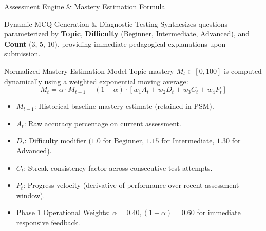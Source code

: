 \documentclass[aspectratio=169,10pt]{beamer}
\begin{document}
\begin{frame}{Assessment Engine \& Mastery Estimation Formula}
  \begin{block}{Dynamic MCQ Generation & Diagnostic Testing}
    Synthesizes questions parameterized by \textbf{Topic}, \textbf{Difficulty} (Beginner, Intermediate, Advanced), and \textbf{Count} (3, 5, 10), providing immediate pedagogical explanations upon submission.
  \end{block}
  \begin{exampleblock}{Normalized Mastery Estimation Model}
    Topic mastery $M_t \in [0, 100]$ is computed dynamically using a weighted exponential moving average:
    \begin{equation*}
      M_t = \alpha \cdot M_{t-1} + (1 - \alpha) \cdot \left[ w_1 A_t + w_2 D_t + w_3 C_t + w_4 P_t \right]
    \end{equation*}
    \small
    \begin{itemize}
      \item $M_{t-1}$: Historical baseline mastery estimate (retained in PSM).
      \item $A_t$: Raw accuracy percentage on current assessment.
      \item $D_t$: Difficulty modifier ($1.0$ for Beginner, $1.15$ for Intermediate, $1.30$ for Advanced).
      \item $C_t$: Streak consistency factor across consecutive test attempts.
      \item $P_t$: Progress velocity (derivative of performance over recent assessment window).
      \item Phase 1 Operational Weights: $\alpha = 0.40, (1-\alpha) = 0.60$ for immediate responsive feedback.
    \end{itemize}
  \end{exampleblock}
\end{frame}
\end{document}

